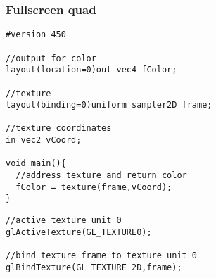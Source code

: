 \begin{frame}[fragile]
\frametitle{Fullscreen quad}
  {\scriptsize
  \begin{verbatim}
#version 450

//output for color
layout(location=0)out vec4 fColor;

//texture
layout(binding=0)uniform sampler2D frame;

//texture coordinates
in vec2 vCoord;

void main(){
  //address texture and return color
  fColor = texture(frame,vCoord);
}
  \end{verbatim}
  }
  {\scriptsize
  \begin{verbatim}
//active texture unit 0
glActiveTexture(GL_TEXTURE0);

//bind texture frame to texture unit 0
glBindTexture(GL_TEXTURE_2D,frame);
  \end{verbatim}
  }
\end{frame}


